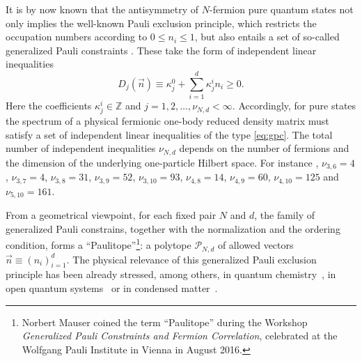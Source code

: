 \documentclass[aps,twocolumn,showpacs,pra,superscriptaddress,floatfix,longbibliography]{revtex4-1}
\newcommand{\7}{\dagger}
\begin{document}
It is by now known that the antisymmetry of $N$-fermion pure quantum
states not only implies the well-known Pauli exclusion principle,
which restricts the occupation numbers according to \cite{Col2}
$0\leq n_i\leq 1$, but also entails a set of so-called generalized
Pauli constraints \cite{Kly2,Kly3,CS2013,CSQMath12}. These take the form of 
independent linear inequalities
\begin{equation}
  \label{eq:gpc}
  D_j(\vec{n}) \equiv \kappa_j^{0}+\sum_{i=1}^d\kappa_j^{i}  
  n_i\geq 0 .
\end{equation}
Here the coefficients $\kappa_j^{i} \in \mathbb{Z}$ and
$j=1,2,\ldots,\nu_{N,d}<\infty$. Accordingly, for pure
states the spectrum of a physical fermionic one-body reduced 
density matrix must satisfy a set of independent linear 
inequalities of the type \eqref{eq:gpc}. The total 
number of independent inequalities $\nu_{N,d}$ depends
on the number of fermions and the dimension of the underlying 
one-particle Hilbert space. For instance \cite{Kly3},
$\nu_{3,6} = 4$, $\nu_{3,7} = 4$, $\nu_{3,8} = 31$, 
 $\nu_{3,9} = 52$,  $\nu_{3,10} = 93$, $\nu_{4,8} = 14$,
 $\nu_{4,9} = 60$,
  $\nu_{4,10} = 125$ and $\nu_{5,10} = 161$.

From a geometrical viewpoint, for each fixed pair 
$N$ and  $d$, the family of generalized Pauli
constrains, together with the normalization and the ordering
condition, forms a 
``Paulitope''\footnote{Norbert Mauser
coined the term ``Paulitope'' during the Workshop
\textit{Generalized Pauli Constraints and Fermion Correlation}, 
celebrated at the Wolfgang Pauli Institute in Vienna in August 2016.}: a polytope $\mathcal{P}_{N,d}$ of allowed vectors 
$\vec{n} \equiv (n_i)_{i=1}^d$. 
The
physical relevance of this generalized Pauli exclusion 
principle has been already stressed, among others, in quantum
chemistry~\cite{CSQuasipinning,BenavLiQuasi, Mazz14,
Benavdoubly,
BenavQuasi2, chakraborty2015structure, RDMFT,CSHFZPC, 
CS2016b,TVS16,TVS17,QUA:QUA25376}, 
in open
quantum systems~\cite{MazzOpen} or in condensed
matter~\cite{CS2015Hubbard,CSthesis}. 
\end{document}
